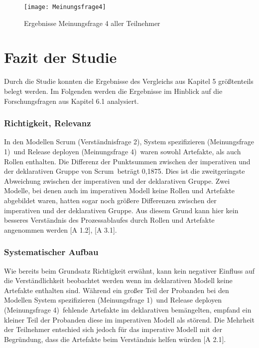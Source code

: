 \begin{figure}[htp]
\begin{center}
  \texttt{[image: Meinungsfrage4]} %
  \caption{Ergebnisse Meinungsfrage 4 aller Teilnehmer}
  \label{fig:Meinungsfrage4}
\end{center}
\end{figure}


\clearpage

\section{Fazit der Studie}

Durch die Studie konnten die Ergebnisse des Vergleichs aus Kapitel 5 größtenteils belegt werden. Im Folgenden werden die Ergebnisse im Hinblick auf die Forschungsfragen aus Kapitel 6.1 analysiert.\newline

\subsubsection{Richtigkeit, Relevanz}


In den Modellen \grqq Scrum (Verständnisfrage 2)\grqq, \grqq System spezifizieren (Meinungsfrage 1)\grqq \ und \grqq Release deployen (Meinungsfrage 4)\grqq \ waren sowohl Artefakte, als auch Rollen enthalten. Die Differenz der Punktsummen zwischen der imperativen und der deklarativen Gruppe von \grqq Scrum\grqq \ beträgt 0,1875. Dies ist die zweitgeringste Abweichung zwischen der imperativen und der deklarativen Gruppe. Zwei Modelle, bei denen auch im imperativen Modell keine Rollen und Artefakte abgebildet waren, hatten sogar noch größere Differenzen zwischen der imperativen und der deklarativen Gruppe. Aus diesem Grund kann hier kein besseres Verständnis des Prozessablaufes durch Rollen und Artefakte angenommen werden [A 1.2], [A 3.1]. \newline

\subsubsection{Systematischer Aufbau}

Wie bereits beim Grundsatz Richtigkeit erwähnt, kann kein negativer Einfluss auf die Verständlichkeit beobachtet werden wenn im deklarativen Modell keine Artefakte enthalten sind.\newline
Während ein großer Teil der Probanden bei den Modellen \grqq System spezifizieren (Meinungsfrage 1)\grqq \ und \grqq Release deployen (Meinungsfrage 4)\grqq \ fehlende Artefakte im deklarativen bemängelten, empfand ein kleiner Teil der Probanden diese im imperativen Modell als störend. Die Mehrheit der Teilnehmer entschied sich jedoch für das imperative Modell mit der Begründung, dass die Artefakte beim Verständnis helfen würden [A 2.1]. 

